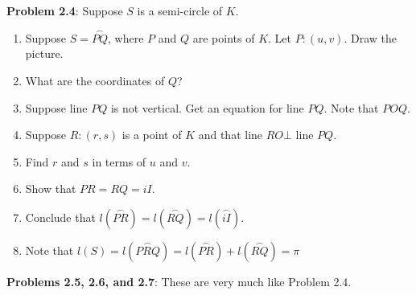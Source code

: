 \documentclass[english]{book}
\newcommand{\arc}[1]{\overset{\frown}{#1} }
\begin{document}
\textbf{Problem 2.4}: Suppose $S$ is a semi-circle of $K$.
\begin{enumerate}[\hspace{1cm}1)]
  \item Suppose $S = \arc{PQ}$, where $P$ and $Q$ are points of $K$. Let $P:(u,v)$. Draw the picture.
  \item What are the coordinates of $Q$?
  \item Suppose line $PQ$ is not vertical. Get an equation for line $PQ$. Note that $POQ$.
  \item Suppose $R:(r,s)$ is a point of $K$ and that line $RO \bot$ line $PQ$.
  \item Find $r$ and $s$ in terms of $u$ and $v$.
  \item Show that $PR = RQ = iI$.
  \item Conclude that $l(\arc{PR}) = l(\arc{RQ}) = l(\arc{iI})$.
  \item Note that $l(S) = l(\arc{PRQ}) = l(\arc{PR}) + l(\arc{RQ}) = \pi$
\end{enumerate}

\textbf{Problems 2.5, 2.6, and 2.7}: These are very much like Problem 2.4.

\vspace{0.3cm}
\end{document}
